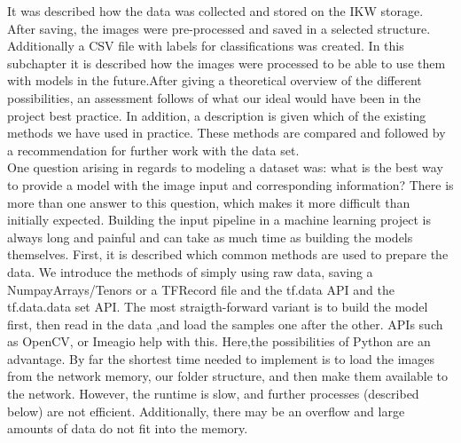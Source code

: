 {It was described how the data was collected and stored on the IKW storage. After saving, the images were pre-processed and saved in a selected structure. Additionally a CSV file with labels for classifications was created. In this subchapter it is described how the images were processed to be able to use them with models in the future.After giving a theoretical overview of the different possibilities, an assessment follows of what our ideal would have been in the project best practice.  In addition, a description is given which of the existing methods we have used in practice. These methods are compared and followed by a recommendation for further work with the data set. \\
One question arising in regards to modeling a dataset was: what is the best way to provide a model with the image input and corresponding information? There is more than one answer to this question, which makes it more difficult than initially expected. Building the input pipeline in a machine learning project is always long and painful and can take as much time as building the models themselves. First, it is described which common methods are used to prepare the data. We introduce the methods of simply using raw data, saving a NumpayArrays/Tenors or a TFRecord file and the tf.data API and the tf.data.data set API. 
The most straigth-forward variant is to build the model first, then read in the data ,and load the samples one after the other. APIs such as OpenCV, or Imeagio help with this. Here,the possibilities of Python are an advantage. By far the shortest time needed to implement is to load the images from the network memory, our folder structure, and then make them available to the network. However, the runtime is slow, and further processes (described below) are not efficient. Additionally, there may be an overflow and large amounts of data do not fit into the memory. \\
\\
}
